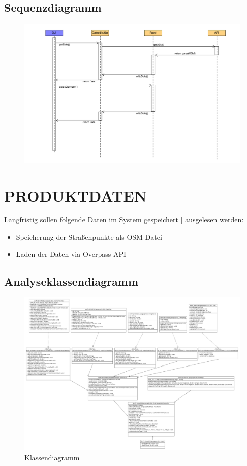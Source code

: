 	\subsection{Sequenzdiagramm}
	\begin{figure}[H]
	\centering
	\includegraphics[width=0.7\linewidth]{images/Squenz}
	\caption{}
	\label{fig:Seq}
	\end{figure}
	
	
	\section{\Large PRODUKTDATEN}
		Langfristig sollen folgende Daten im System gespeichert | ausgelesen werden:
	\begin{itemize}
		\item Speicherung der Straßenpunkte als OSM-Datei
		\item Laden der Daten via Overpass API
	\end{itemize}
	\subsection{Analyseklassendiagramm}	
	\begin{figure}[H]
	\centering
	\includegraphics[width=0.7\linewidth]{images/Klassendiagramm}
	\caption{Klassendiagramm}
	\label{fig:Klassendiagramm}
	\end{figure}
